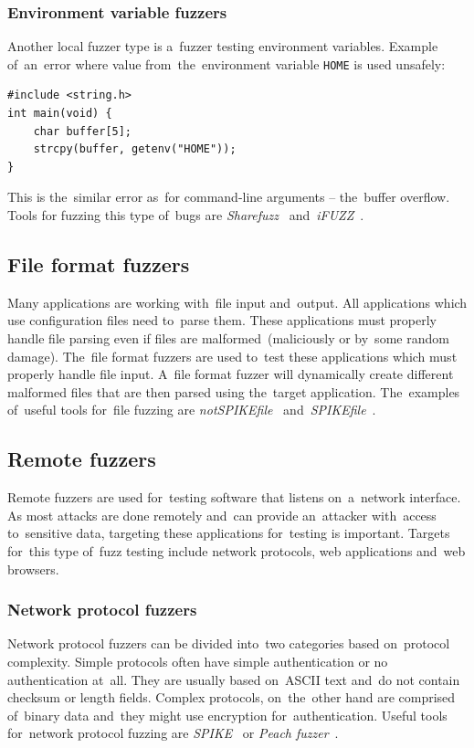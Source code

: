\subsubsection{Environment variable fuzzers}
Another local fuzzer type is a~fuzzer testing environment variables. Example
of~an~error where value from~the~environment variable \texttt{HOME} is used unsafely:
\begin{lstlisting}[frame=single]
#include <string.h>
int main(void) {
    char buffer[5];
    strcpy(buffer, getenv("HOME"));
}
\end{lstlisting}
This is the~similar error as~for command-line arguments -- the~buffer overflow.
Tools for fuzzing this type of~bugs are
\emph{Sharefuzz}~\cite{Aitel} and~\emph{iFUZZ}~\cite{fuzzing.org}.

\subsection{File format fuzzers}
Many applications are working with~file input and~output. All applications which
use configuration files need to~parse them. These applications must properly handle
file parsing even if files are malformed~(maliciously or by~some random damage).
The~file format fuzzers are used to~test these applications which must properly
handle file input. A~file format fuzzer will dynamically create different malformed
files that are then parsed using the~target application. The~examples of~useful
tools for~file fuzzing are \emph{notSPIKEfile}~\cite{fuzzing.org} and~\emph{SPIKEfile}~\cite{fuzzing.org}.

\subsection{Remote fuzzers}
Remote fuzzers are used for~testing software that listens on~a~network
interface. As most attacks are done remotely and~can provide an~attacker
with~access to~sensitive data, targeting these applications for~testing is
important. Targets for~this type of~fuzz testing include network protocols, web
applications and~web browsers.

\subsubsection{Network protocol fuzzers}
Network protocol fuzzers can be divided into~two categories based on~protocol
complexity. Simple protocols often have simple authentication or no authentication
at~all. They are usually based on~ASCII text and~do not contain checksum or length
fields. Complex protocols, on~the~other hand are comprised of~binary data and~they
might use encryption for~authentication. Useful tools for~network protocol fuzzing
are \emph{SPIKE}~\cite{Aitel} or \emph{Peach fuzzer}~\cite{Peach}.

